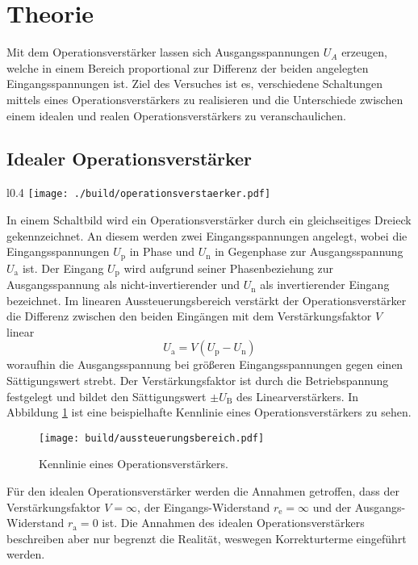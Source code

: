 \section{Theorie}\label{sec:theorie}
Mit dem Operationsverstärker lassen sich Ausgangsspannungen $U_A$
erzeugen, welche in einem Bereich proportional zur Differenz der beiden
angelegten Eingangsspannungen ist.
Ziel des Versuches ist es, verschiedene Schaltungen mittels eines
Operationsverstärkers zu realisieren und die Unterschiede zwischen einem idealen
und realen Operationsverstärkers zu veranschaulichen.

\subsection{Idealer Operationsverstärker}%
\label{sub:idealer_operationsverstaerker}

\begin{wrapfigure}{l}{0.4\textwidth}
		\centering
		\texttt{[image: ./build/operationsverstaerker.pdf]}
		\caption{Schaltbild eines idealen Operationsverstärkers.
		\cite{anleitung}}
		\label{fig:opv}
\end{wrapfigure}
In einem Schaltbild wird ein Operationsverstärker durch ein gleichseitiges
Dreieck gekennzeichnet.
An diesem werden zwei Eingangsspannungen angelegt, wobei die
Eingangsspannungen $U_\text{p}$ in Phase
und $U_\text{n}$ in Gegenphase zur Ausgangsspannung
$U_\text{a}$ ist.
Der Eingang $U_\text{p}$ wird aufgrund seiner Phasenbeziehung zur Ausgangsspannung
als nicht-invertierender und $U_\text{n}$ als invertierender Eingang bezeichnet.
Im linearen Aussteuerungsbereich verstärkt der Operationsverstärker die
Differenz zwischen den beiden Eingängen mit dem Verstärkungsfaktor $V$ linear
\begin{equation}
		\label{eq:diff}
		U_\text{a} = V \left( U_\text{p} - U_\text{n} \right)
\end{equation}
woraufhin die Ausgangsspannung bei größeren Eingangsspannungen gegen einen
Sättigungswert strebt.
Der Verstärkungsfaktor ist durch die Betriebspannung festgelegt
und bildet den Sättigungswert $\pm U_\text{B}$  des Linearverstärkers.
In Abbildung \ref{fig:kennlinie} ist eine beispielhafte Kennlinie eines
Operationsverstärkers zu sehen.
\begin{figure}[h]
		\centering
		\texttt{[image: build/aussteuerungsbereich.pdf]}
		\caption{Kennlinie eines Operationsverstärkers. \cite{anleitung}}
		\label{fig:kennlinie}
\end{figure}
Für den idealen Operationsverstärker werden die Annahmen getroffen, dass der
Verstärkungsfaktor $V = \infty$, der Eingangs-Widerstand $r_\text{e} =
\infty$ und der Ausgangs-Widerstand $r_\text{a} = 0$ ist.
Die Annahmen des idealen Operationsverstärkers beschreiben aber nur begrenzt
die Realität, weswegen Korrekturterme eingeführt werden.

